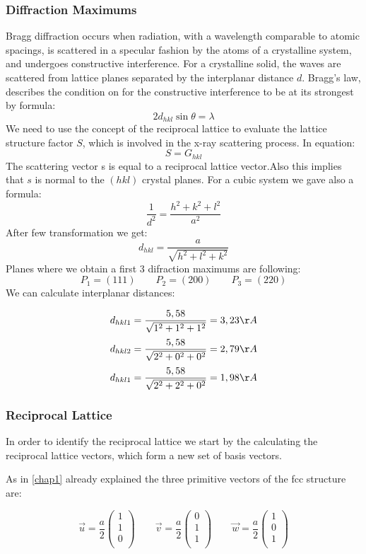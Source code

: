\subsubsection*{Diffraction Maximums}
Bragg diffraction occurs when radiation, with a wavelength comparable to atomic 
spacings, is scattered in a specular fashion by the atoms of a crystalline system, and 
undergoes constructive interference. For a crystalline solid, the waves are scattered 
from lattice planes separated by the interplanar distance $d$. Bragg's law,  describes 
the condition on for the constructive interference to be at its strongest by formula:
\begin{equation}
\label{Bragg}
2d_{hkl} \sin{\theta} =  \lambda
\end{equation}
We need to use the concept of the reciprocal lattice to evaluate the lattice structure
factor $S$, which is involved in the x-ray scattering process. In equation:
\begin{equation}
S = G_{hkl}
\end{equation}
The scattering vector s is equal to a
reciprocal lattice vector.Also this implies that $s$ is normal to the $(hkl)$ crystal planes. For a cubic system we gave also a formula:
\begin{equation}
\frac{1}{d^2} = \frac{h^2 + k^2 + l^2}{a^2}
\end{equation}
After few transformation we get:
$$
d_{hkl} = \frac{a}{\sqrt{h^2 + l^2 + k^2}}
$$
Planes where we obtain a first 3 difraction maximums are following: 
$$P_1 = (111) \qquad P_2 = (200) \qquad P_3 = ( 220) $$  
We can calculate interplanar distances:

$$d_{hkl1} = \frac{5,58}{\sqrt{1^2 + 1^2 + 1^2}} = 3,23 \AA$$
$$d_{hkl2} = \frac{5,58}{\sqrt{2^2 + 0^2 + 0^2}} = 2,79 \AA$$
$$d_{hkl1} = \frac{5,58}{\sqrt{2^2 + 2^2 + 0^2}} = 1,98 \AA$$


\subsubsection*{Reciprocal Lattice}
In order to identify the reciprocal lattice we start by the calculating
the reciprocal lattice vectors, which form a new set of basis vectors.

As in \autoref{chap1} already explained the three primitive vectors
of the fcc structure are:

$$\vec{u} = \frac{a}{2} \left(\begin{matrix}1\\1\\0\\\end{matrix}\right) \qquad
\vec{v} = \frac{a}{2} \left(\begin{matrix}0\\1\\1\\\end{matrix}\right) \qquad
\vec{w} = \frac{a}{2} \left(\begin{matrix}1\\0\\1\\\end{matrix}\right)$$

